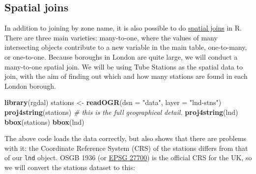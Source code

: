 \documentclass[]{article}
\newenvironment{Shaded}{}{}
\newcommand{\KeywordTok}[1]{\textcolor[rgb]{0.00,0.44,0.13}{\textbf{{#1}}}}
\newcommand{\DataTypeTok}[1]{\textcolor[rgb]{0.56,0.13,0.00}{{#1}}}
\newcommand{\StringTok}[1]{\textcolor[rgb]{0.25,0.44,0.63}{{#1}}}
\newcommand{\CommentTok}[1]{\textcolor[rgb]{0.38,0.63,0.69}{\textit{{#1}}}}
\newcommand{\NormalTok}[1]{{#1}}
\begin{document}
\subsection{Spatial joins}

In addition to joining by zone name, it is also possible to do
\href{http://help.arcgis.com/en/arcgisdesktop/10.0/help/index.html\#//00080000000q000000}{spatial
joins} in R. There are three main varieties: many-to-one, where the
values of many intersecting objects contribute to a new variable in the
main table, one-to-many, or one-to-one. Because boroughs in London are
quite large, we will conduct a many-to-one spatial join. We will be
using Tube Stations as the spatial data to join, with the aim of finding
out which and how many stations are found in each London borough.

\begin{Shaded}
\begin{Highlighting}[]
\KeywordTok{library}\NormalTok{(rgdal)}
\NormalTok{stations <- }\KeywordTok{readOGR}\NormalTok{(}\DataTypeTok{dsn =} \StringTok{"data"}\NormalTok{, }\DataTypeTok{layer =} \StringTok{"lnd-stns"}\NormalTok{)}
\KeywordTok{proj4string}\NormalTok{(stations)  }\CommentTok{# this is the full geographical detail.}
\KeywordTok{proj4string}\NormalTok{(lnd)}
\KeywordTok{bbox}\NormalTok{(stations)}
\KeywordTok{bbox}\NormalTok{(lnd)}
\end{Highlighting}
\end{Shaded}
The above code loads the data correctly, but also shows that there are
problems with it: the Coordinate Reference System (CRS) of the stations
differs from that of our \texttt{lnd} object. OSGB 1936 (or
\href{http://spatialreference.org/ref/epsg/27700/}{EPSG 27700}) is the
official CRS for the UK, so we will convert the stations dataset to
this:
\end{document}
